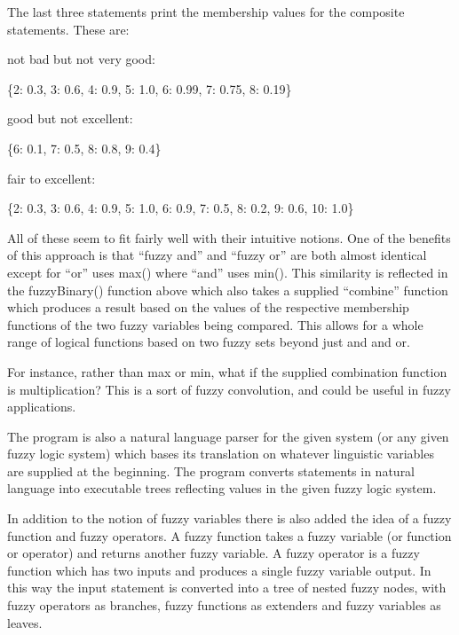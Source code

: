 \documentclass[12pt]{article}
\begin{document}
The last three statements print the membership values for the composite statements.  These are:

not bad but not very good:

\{2: 0.3,
 3: 0.6,
 4: 0.9,
 5: 1.0,
 6: 0.99,
 7: 0.75,
 8: 0.19\}

good but not excellent:

\{6: 0.1,
 7: 0.5,
 8: 0.8,
 9: 0.4\}

fair to excellent:

\{2: 0.3,
 3: 0.6,
 4: 0.9,
 5: 1.0,
 6: 0.9,
 7: 0.5,
 8: 0.2,
 9: 0.6,
 10: 1.0\}

All of these seem to fit fairly well with their intuitive notions.  One of the benefits of this approach is that ``fuzzy and'' and ``fuzzy or'' are both almost identical except for ``or'' uses max() where ``and'' uses min().  This similarity is reflected in the fuzzyBinary() function above which also takes a supplied ``combine'' function which produces a result based on the values of the respective membership functions of the two fuzzy variables being compared.  This allows for a whole range of logical functions based on two fuzzy sets beyond just and and or.

For instance, rather than max or min, what if the supplied combination function is multiplication?  This is a sort of fuzzy convolution, and could be useful in fuzzy applications.

The program is also a natural language parser for the given system (or any given fuzzy logic system) which bases its translation on whatever linguistic variables are supplied at the beginning.  The program converts statements in natural language into executable trees reflecting values in the given fuzzy logic system.  

In addition to the notion of fuzzy variables there is also added the idea of a fuzzy function and fuzzy operators.  A fuzzy function takes a fuzzy variable (or function or operator) and returns another fuzzy variable.  A fuzzy operator is a fuzzy function which has two inputs and produces a single fuzzy variable output.  In this way the input statement is converted into a tree of nested fuzzy nodes, with fuzzy operators as branches, fuzzy functions as extenders and fuzzy variables as leaves.  
\end{document}
